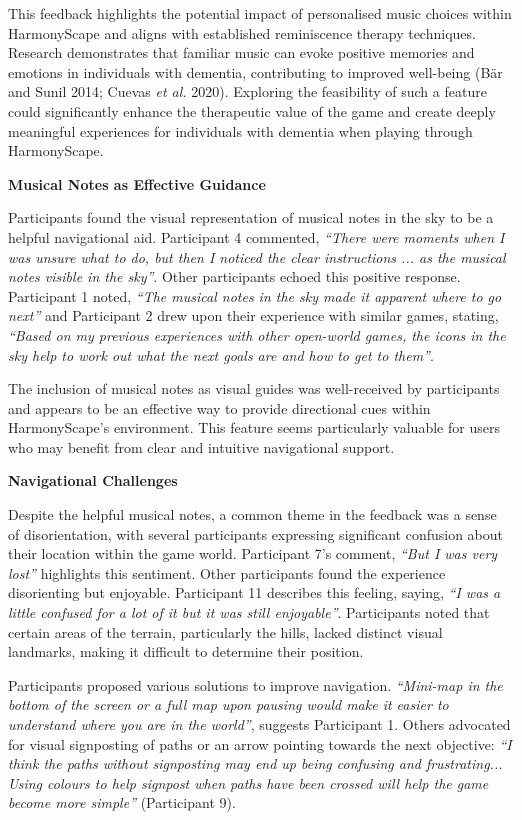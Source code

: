 \documentclass{l4proj}
\begin{document}
This feedback highlights the potential impact of personalised music choices within HarmonyScape and aligns with established reminiscence therapy techniques. Research demonstrates that familiar music can evoke positive memories and emotions in individuals with dementia, contributing to improved well-being (Bär and Sunil 2014; Cuevas \emph{et al.} 2020). Exploring the feasibility of such a feature could significantly enhance the therapeutic value of the game and create deeply meaningful experiences for individuals with dementia when playing through HarmonyScape.
\newline

\textbf{Musical Notes as Effective Guidance}

Participants found the visual representation of musical notes in the sky to be a helpful navigational aid. Participant 4 commented, \emph{“There were moments when I was unsure what to do, but then I noticed the clear instructions ... as the musical notes visible in the sky”}. Other participants echoed this positive response. Participant 1 noted, \emph{“The musical notes in the sky made it apparent where to go next”} and Participant 2 drew upon their experience with similar games, stating, \emph{“Based on my previous experiences with other open-world games, the icons in the sky help to work out what the next goals are and how to get to them”}.

The inclusion of musical notes as visual guides was well-received by participants and appears to be an effective way to provide directional cues within HarmonyScape's environment. This feature seems particularly valuable for users who may benefit from clear and intuitive navigational support.
\newline

\textbf{Navigational Challenges}

Despite the helpful musical notes, a common theme in the feedback was a sense of disorientation, with several participants expressing significant confusion about their location within the game world. Participant 7's comment, \emph{“But I was very lost”} highlights this sentiment. Other participants found the experience disorienting but enjoyable. Participant 11 describes this feeling, saying, \emph{“I was a little confused for a lot of it but it was still enjoyable”}. Participants noted that certain areas of the terrain, particularly the hills, lacked distinct visual landmarks, making it difficult to determine their position. 

Participants proposed various solutions to improve navigation. \emph{“Mini-map in the bottom of the screen or a full map upon pausing would make it easier to understand where you are in the world”}, suggests Participant 1. Others advocated for visual signposting of paths or an arrow pointing towards the next objective: \emph{“I think the paths without signposting may end up being confusing and frustrating... Using colours to help signpost when paths have been crossed will help the game become more simple”} (Participant 9).
\end{document}
